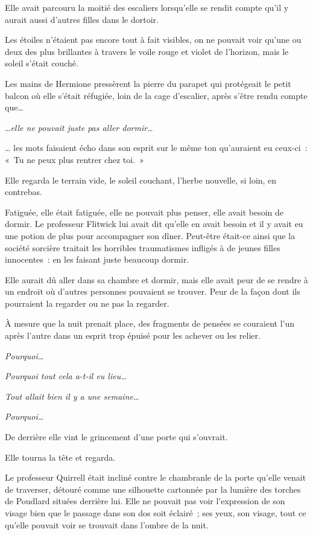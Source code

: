 Elle avait parcouru la moitié des escaliers lorsqu'elle se rendit compte qu'il y aurait aussi d'autres filles dans le dortoir.

\later

Les étoiles n'étaient pas encore tout à fait visibles, on ne pouvait voir qu'une ou deux des plus brillantes à travers le voile rouge et violet de l'horizon, mais le soleil s'était couché.

Les mains de Hermione pressèrent la pierre du parapet qui protégeait le petit balcon où elle s'était réfugiée, loin de la cage d'escalier, après s'être rendu compte que…

…\emph{elle ne pouvait juste pas aller dormir…}

… les mots faisaient écho dans son esprit sur le même ton qu'auraient eu ceux-ci~: «~Tu ne peux plus rentrer chez toi.~»

Elle regarda le terrain vide, le soleil couchant, l'herbe nouvelle, si loin, en contrebas.

Fatiguée, elle était fatiguée, elle ne pouvait plus penser, elle avait besoin de dormir.
Le professeur Flitwick lui avait dit qu'elle en avait besoin et il y avait eu une potion de plus pour accompagner son dîner.
Peut-être était-ce ainsi que la société sorcière traitait les horribles traumatismes infligés à de jeunes filles innocentes~: en les faisant juste beaucoup dormir.

Elle aurait dû aller dans sa chambre et dormir, mais elle avait peur de se rendre à un endroit où d'autres personnes pouvaient se trouver.
Peur de la façon dont ils pourraient la regarder ou ne pas la regarder.

À mesure que la nuit prenait place, des fragments de pensées se couraient l'un après l'autre dans un esprit trop épuisé pour les achever ou les relier.

\emph{Pourquoi…}

\emph{Pourquoi tout cela a-t-il eu lieu…}

\emph{Tout allait bien il y a une semaine…}

\emph{Pourquoi…}

De derrière elle vint le grincement d'une porte qui s'ouvrait.

Elle tourna la tête et regarda.

Le professeur Quirrell était incliné contre le chambranle de la porte qu'elle venait de traverser, détouré comme une silhouette cartonnée par la lumière des torches de Poudlard situées derrière lui.
Elle ne pouvait pas voir l'expression de son visage bien que le passage dans son dos soit éclairé~; ses yeux, son visage, tout ce qu'elle pouvait voir se trouvait dans l'ombre de la nuit.

